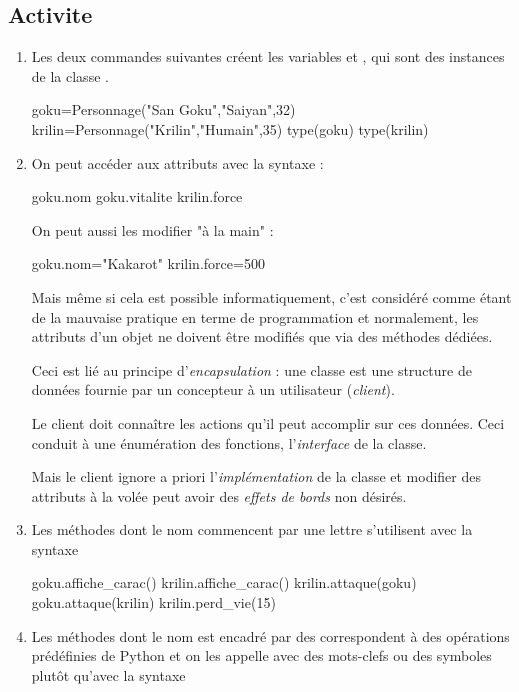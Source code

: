 \documentclass[11pt,a4paper,french,twoside]{PMCours}
\begin{document}
\subsection*{Activite}
\begin{enumerate}
\item Les deux commandes suivantes créent les variables  et ,
qui sont des instances de la classe .
\begin{Python}
goku=Personnage("San Goku","Saiyan",32)
krilin=Personnage("Krilin","Humain",35)
type(goku)
type(krilin)
\end{Python}
    \item On peut accéder aux attributs avec la syntaxe  :
\begin{Python}
goku.nom
goku.vitalite
krilin.force
\end{Python} 
    On peut aussi les modifier "à la main" :
\begin{Python}
goku.nom="Kakarot"
krilin.force=500
\end{Python} 
    Mais même si cela est possible informatiquement, c'est considéré comme étant 
    de la mauvaise pratique en terme de programmation et normalement, les attributs 
    d'un objet ne doivent être modifiés que via des méthodes dédiées.

Ceci est lié au principe d'{\em encapsulation } : une classe est une structure 
de données fournie par un concepteur à un utilisateur ({\em client}).

Le client doit connaître les actions qu'il peut accomplir sur ces données. 
Ceci conduit à une énumération des fonctions, l'{\em interface} de la classe. 

Mais le client ignore a priori l'{\em implémentation} de la classe et modifier 
des attributs à la volée peut avoir des {\em effets de bords} non désirés. 

\item Les méthodes dont le nom commencent par une lettre s'utilisent avec la syntaxe


\begin{Python}
goku.affiche_carac()
krilin.affiche_carac()
krilin.attaque(goku)
goku.attaque(krilin)
krilin.perd_vie(15)
\end{Python}

\item Les méthodes dont le nom est encadré par des \code{\_\_} correspondent à 
des opérations prédéfinies de Python et on les appelle avec des mots-clefs ou des
symboles plutôt qu'avec la syntaxe 


\end{enumerate}
\end{document}
